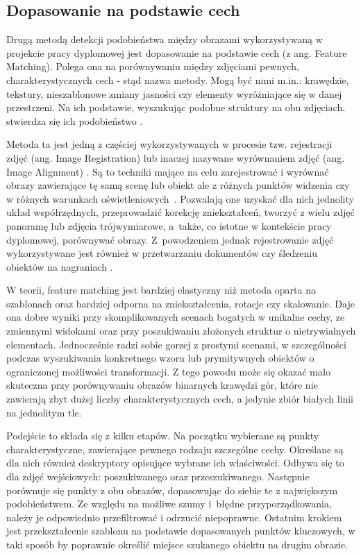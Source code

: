 \subsection{Dopasowanie na podstawie cech} \label{sec:feature_matching}

Drugą metodą detekcji podobieństwa między obrazami wykorzystywaną w projekcie pracy dyplomowej jest dopasowanie na podstawie cech (z ang. Feature Matching). Polega ona na porównywaniu między zdjęciami pewnych, charakterystycznych cech - stąd nazwa metody. Mogą być nimi m.in.: krawędzie, tekstury, nieszablonowe zmiany jasności czy elementy wyróżniające się w danej przestrzeni. Na ich podstawie, wyszukując podobne struktury na obu zdjęciach, stwierdza się ich podobieństwo \cite{opencv_understand_features}\cite{feature_lieberman}. 

Metoda ta jest jedną z częściej wykorzystywanych w procesie tzw. rejestracji zdjęć (ang. Image Registration) lub inaczej nazywane wyrównaniem zdjęć (ang. Image Alignment) \cite{szelinski}. Są to techniki mające na celu zarejestrować i wyrównać obrazy zawierające tę samą scenę lub obiekt ale z różnych punktów widzenia czy w różnych warunkach oświetleniowych~\cite{image_reg_geeks,image_reg_pyimage}. Pozwalają one uzyskać dla nich jednolity układ współrzędnych, przeprowadzić korekcję zniekształceń, tworzyć z wielu zdjęć panoramę lub zdjęcia trójwymiarowe, a~także, co istotne w kontekście pracy dyplomowej, porównywać obrazy. Z~powodzeniem jednak rejestrowanie zdjęć wykorzystywane jest również w przetwarzaniu dokumentów czy śledzeniu obiektów na nagraniach \cite{image_reg_practical}. 

W teorii, feature matching jest bardziej elastyczny niż metoda oparta na szablonach oraz bardziej odporna na zniekształcenia, rotacje czy skalowanie. Daje ona dobre wyniki przy skomplikowanych scenach bogatych w unikalne cechy, ze zmiennymi widokami oraz przy poszukiwaniu złożonych struktur o nietrywialnych elementach. Jednocześnie radzi sobie gorzej z prostymi scenami, w szczególności podczas wyszukiwania konkretnego wzoru lub prymitywnych obiektów o ograniczonej możliwości transformacji. Z tego powodu może się okazać mało skuteczna przy porównywaniu obrazów binarnych krawędzi gór, które nie zawierają zbyt dużej liczby charakterystycznych cech, a jedynie zbiór białych linii na jednolitym tle.


Podejście to składa się z kilku etapów. Na początku wybierane są punkty charakterystyczne, zawierające pewnego rodzaju szczególne cechy. Określane są dla nich również deskryptory opisujące wybrane ich właściwości. Odbywa się to dla zdjęć wejściowych: poszukiwanego oraz przeszukiwanego. Następnie porównuje się punkty z obu obrazów, dopasowując do siebie te z największym podobieństwem. Ze względu na możliwe szumy i~błędne przyporządkowania, należy je odpowiednio przefiltrować i odrzucić niepoprawne. Ostatnim krokiem jest przekształcenie szablonu na podstawie dopasowanych punktów kluczowych, w taki sposób by poprawnie określić miejsce szukanego obiektu na drugim obrazie. 



